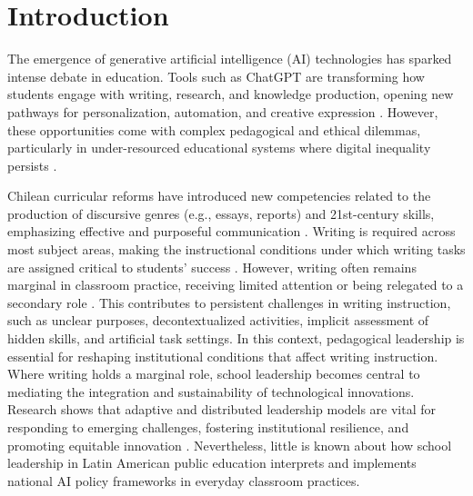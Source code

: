 \documentclass[english]{textolivre}
\begin{document}
\begin{polyabstract}
\begin{portuguese}
\begin{abstract}
\end{abstract}
\end{portuguese}
\end{polyabstract}

\section{Introduction}\label{sec-intro}
The emergence of generative artificial intelligence (AI) technologies has sparked intense debate in education. Tools such as ChatGPT are transforming how students engage with writing, research, and knowledge production, opening new pathways for personalization, automation, and creative expression \cite{floridi2020gpt3,duart2024trends}. However, these opportunities come with complex pedagogical and ethical dilemmas, particularly in under-resourced educational systems where digital inequality persists \cite{unesco2021reimagining}.

Chilean curricular reforms have introduced new competencies related to the production of discursive genres (e.g., essays, reports) and 21st-century skills, emphasizing effective and purposeful communication \cite{mineduc2019bases}. Writing is required across most subject areas, making the instructional conditions under which writing tasks are assigned critical to students’ success \cite{tolchinsky2001produccion}. However, writing often remains marginal in classroom practice, receiving limited attention or being relegated to a secondary role \cite{figueroa2018calidad}. This contributes to persistent challenges in writing instruction, such as unclear purposes, decontextualized activities, implicit assessment of hidden skills, and artificial task settings. In this context, pedagogical leadership is essential for reshaping institutional conditions that affect writing instruction. Where writing holds a marginal role, school leadership becomes central to mediating the integration and sustainability of technological innovations. Research shows that adaptive and distributed leadership models are vital for responding to emerging challenges, fostering institutional resilience, and promoting equitable innovation \cite{heifetz2009practice,montecinos2018moving}. Nevertheless, little is known about how school leadership in Latin American public education interprets and implements national AI policy frameworks in everyday classroom practices.
\end{document}
